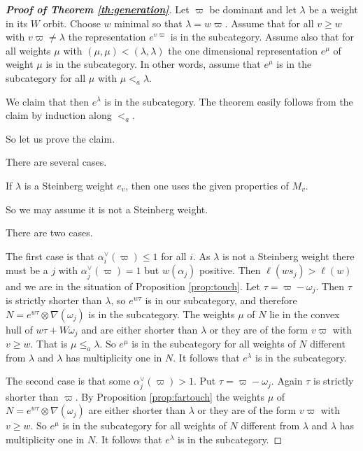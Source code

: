\documentclass[sn-mathphys-num]{sn-jnl}%
\theoremstyle{definition}
\begin{document}
  
  \begin{proof}[\rm \bf  Proof of Theorem \ref{th:generation}]
  Let $\varpi$ be dominant and let $\lambda$ be a weight in its $W$ orbit. Choose $w$ minimal so that 
  $\lambda=w\varpi$.
  Assume that for all $v\geq w$ with $v\varpi\neq \lambda$ the representation $e^{v\varpi}$ 
   is in the subcategory.
Assume also that for all weights $\mu$ with $(\mu,\mu)<(\lambda,\lambda)$ 
  the one dimensional representation $e^\mu$ of weight $\mu$ is in the subcategory. 
  In other words, assume that $e^\mu$  is in the subcategory for all $\mu$ with $\mu<_a\lambda$.
  
  We claim that then    $e^\lambda$ is in the subcategory.
  The theorem easily follows from the claim by induction along $<_a$.
  
  So let us prove the claim.
  
  There are several cases.
  
  If $\lambda$ is a Steinberg weight $e_v$, then one uses the given properties of $M_v$.
  
  So we may assume it is not a Steinberg weight.
   
  There are two cases.
  
  The first case is that $\alpha_i^\vee(\varpi)\leq 1$ for all $i$.
  As $\lambda$ is not a Steinberg weight there must be a $j$ with $\alpha_j^\vee(\varpi)=1$ but $w(\alpha_j)$ positive.
 Then $\ell(ws_j)>\ell(w)$ and we are in the situation of Proposition \ref{prop:touch}. 
 Let $\tau=\varpi-\omega_j$. Then $\tau$ is strictly shorter than $\lambda$, so $e^{w\tau}$ is in our subcategory, and therefore
  $N=e^{w\tau}\otimes \nabla(\omega_j)$ is in the subcategory. The weights $\mu$ of $N$  lie in the convex hull of $w\tau+W\omega_j$ and are either shorter than $\lambda$
  or they are of the form $v\varpi$ with $v\geq w$. That is $\mu\leq_a\lambda$.
  So $e^\mu$ is in the subcategory for all weights of $N$ different from $\lambda$ and $\lambda$ has multiplicity one in $N$. It follows that $e^\lambda$ is in the subcategory.
  
  The second case is that some $\alpha_j^\vee(\varpi)> 1$. Put $\tau=\varpi-\omega_j$. Again $\tau$ is strictly shorter than $\varpi$.
  By Proposition \ref{prop:fartouch}
  the weights  $\mu$ of $N=e^{w\tau}\otimes \nabla(\omega_j)$ are either shorter than $\lambda$
  or they are of the form $v\varpi$ with $v\geq w$.
 So $e^\mu$ is in the subcategory for all weights of $N$ different from $\lambda$ and $\lambda$ has multiplicity one in $N$. It follows that $e^\lambda$ is in the subcategory.
  \end{proof}
\end{document}
